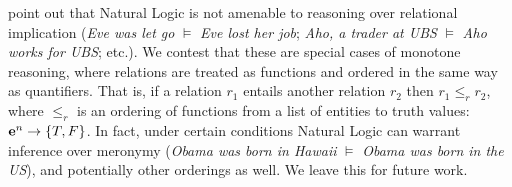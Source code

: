  point out that Natural Logic is
  not amenable to reasoning over relational implication
  (\textit{Eve was let go} $\models$ \textit{Eve lost her job};
   \textit{Aho, a trader at UBS} $\models$ \textit{Aho works for UBS};
   etc.).
We contest that these are special cases of monotone reasoning, where
  relations are treated as functions and ordered in the same way as
  quantifiers.
That is, if a relation $r_1$ entails another relation $r_2$ then
  $r_1 \leq_r r_2$, where $\leq_r$ is an ordering of functions from
  a list of entities to truth values: $\mathbf{e}^n \rightarrow \{T,F\}$.
In fact, under certain conditions Natural Logic can warrant inference
  over meronymy
  (\textit{Obama was born in Hawaii} $\models$ \textit{Obama was born in the US}),
  and potentially other orderings as well.
We leave this for future work.


